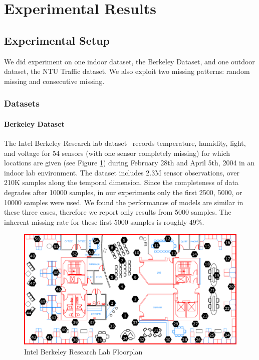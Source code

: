 \section{Experimental Results}  \label{sec:exp}

\subsection{Experimental Setup}
We did experiment on one indoor dataset, the Berkeley Dataset, and one outdoor dataset, the NTU Traffic dataset.
We also exploit two missing patterns: random missing and consecutive missing.
\subsubsection{Datasets}

\paragraph*{Berkeley Dataset}

The Intel Berkeley Research lab dataset~\cite{berkeley2004lab} records temperature, humidity, light, and voltage for 54 sensors (with one sensor completely missing) for which locations are given (see Figure \ref{berkeley_lab}) during February 28th and April 5th, 2004 in an indoor lab environment.
The dataset includes 2.3M sensor observations, over 210K samples along the temporal dimension.
Since the completeness of data degrades after 10000 samples, in our experiments only the first 2500, 5000, or 10000 samples were used.
We found the performances of models are similar in these three cases, therefore we report only results from 5000 samples.
The inherent missing rate for these first 5000 samples is roughly 49\%.

\begin{figure}[H]
\centering
\includegraphics[scale=0.15]{berkeley_lab.png}
\caption{Intel Berkeley Research Lab Floorplan} \label{berkeley_lab}
\end{figure}

